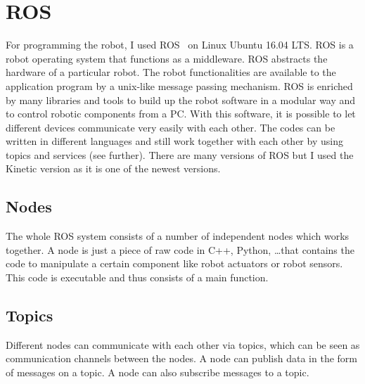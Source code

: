 \documentclass[11pt,a4paper]{report}
\begin{document}
\section{ROS}
For programming the robot, I used ROS~ \cite{ROSTopology} on Linux Ubuntu 16.04 LTS. ROS is a robot operating system that functions as a middleware. ROS abstracts the hardware of a particular robot. The robot functionalities are available to the application program by a unix-like message passing mechanism. ROS is enriched by many libraries and tools to build up the robot software in a modular way and to control robotic components from a PC. With this software, it is possible to let different devices communicate very easily with each other. The codes can be written in different languages and still work together with each other by using topics and services (see further). There are many versions of ROS but I used the Kinetic version as it is one of the newest versions.

\subsection{Nodes}
The whole ROS system consists of a number of independent nodes which works together. A node is just a piece of raw code in C++, Python, \ldots that contains the code to manipulate a certain component like robot actuators or robot sensors. This code is executable and thus consists of a main function.

\subsection{Topics}
Different nodes can communicate with each other via topics, which can be seen as communication channels between the nodes. A node can publish data in the form of messages on a topic. A node can also subscribe messages to a topic.
\end{document}
